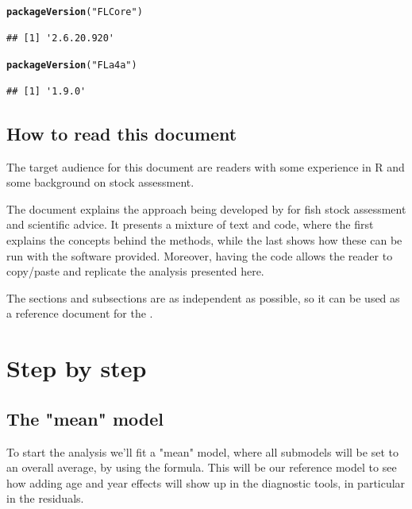 \documentclass[a4paper,english,11pt]{article}\usepackage[]{graphicx}\usepackage[]{xcolor}
\makeatletter
\newcommand{\hlsng}[1]{\textcolor[rgb]{0.192,0.494,0.8}{#1}}%
\newcommand{\hldef}[1]{\textcolor[rgb]{0.345,0.345,0.345}{#1}}%
\newcommand{\hlkwd}[1]{\textcolor[rgb]{0.737,0.353,0.396}{\textbf{#1}}}%
\newenvironment{kframe}{%
 \def\at@end@of@kframe{}%
 \ifinner\ifhmode%
  \def\at@end@of@kframe{\end{minipage}}%
  \begin{minipage}{\columnwidth}%
 \fi\fi%
 \def\FrameCommand##1{\hskip\@totalleftmargin \hskip-\fboxsep
 \colorbox{shadecolor}{##1}\hskip-\fboxsep
     \hskip-\linewidth \hskip-\@totalleftmargin \hskip\columnwidth}%
 \MakeFramed {\advance\hsize-\width
   \@totalleftmargin\z@ \linewidth\hsize
   \@setminipage}}%
 {\par\unskip\endMakeFramed%
 \at@end@of@kframe}
\newenvironment{knitrout}{}{} %
\makeatother
\begin{document}
\begin{knitrout}
\color{fgcolor}\begin{kframe}
\begin{alltt}
\hlkwd{packageVersion}\hldef{(}\hlsng{"FLCore"}\hldef{)}
\end{alltt}
\begin{verbatim}
## [1] '2.6.20.920'
\end{verbatim}
\begin{alltt}
\hlkwd{packageVersion}\hldef{(}\hlsng{"FLa4a"}\hldef{)}
\end{alltt}
\begin{verbatim}
## [1] '1.9.0'
\end{verbatim}
\end{kframe}
\end{knitrout}

\subsection{How to read this document}

The target audience for this document are readers with some experience in R and some background on stock assessment.

The document explains the approach being developed by \aFa for fish stock assessment and scientific advice. It presents a mixture of text and code, where the first explains the concepts behind the methods, while the last shows how these can be run with the software provided. Moreover, having the code allows the reader to copy/paste and replicate the analysis presented here.

The sections and subsections are as independent as possible, so it can be used as a reference document for the . 

\section{Step by step}

\subsection{The "mean" model}

To start the analysis we'll fit a "mean" model, where all submodels will be set to an overall average, by using the  formula. This will be our reference model to see how adding age and year effects will show up in the diagnostic tools, in particular in the residuals.
\end{document}

